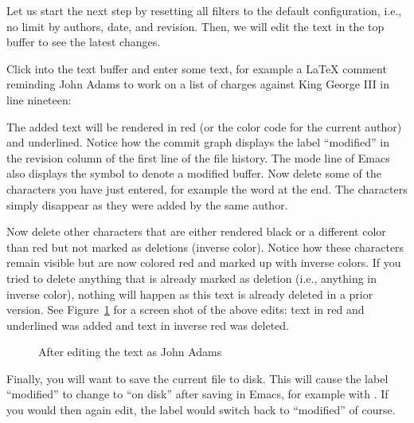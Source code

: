 Let us start the next step by resetting all filters to the default configuration, i.e., no limit by authors, date, and revision.  Then, we will edit the text in the top buffer to see the latest changes.

Click into the text buffer and enter some text, for example a LaTeX comment reminding John Adams to work on a list of charges against King George III in line nineteen:
\begin{FileVerbatim}
\end{FileVerbatim}
The added text will be rendered in red (or the color code for the current author) and underlined.  Notice how the commit graph displays the label ``modified'' in the revision column of the first line of the file history.  The mode line of Emacs also displays the symbol \Code{**} to denote a modified buffer. Now delete some of the characters you have just entered, for example the word  at the end.  The characters simply disappear as they were added by the same author.

Now delete other characters that are either rendered black or a different color than red but not marked as deletions (inverse color).  Notice how these characters remain visible but are now colored red and marked up with inverse colors.  If you tried to delete anything that is already marked as deletion (i.e., anything in inverse color), nothing will happen as this text is already deleted in a prior version.  See Figure~\ref{fig:emacs-modified} for a screen shot of the above edits: text in red and underlined was added and text in inverse red was deleted.

\begin{figure}[t]
\centering
{}
\caption{After editing the text as John Adams} \label{fig:emacs-modified}
\end{figure}

Finally, you will want to save the current file to disk.  This will cause the label ``modified'' to change to ``on disk'' after saving in Emacs, for example with .  If you would then again edit, the label would switch back to ``modified'' of course.

